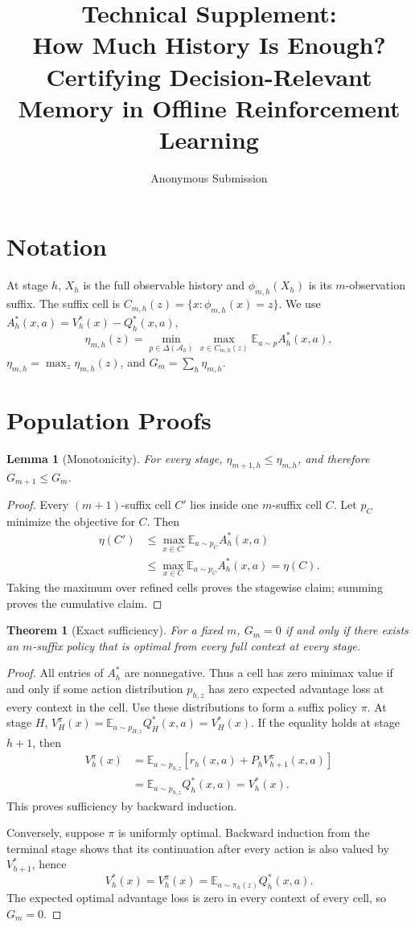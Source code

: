 \documentclass[letterpaper]{article} %
\title{Technical Supplement:\\
How Much History Is Enough? Certifying Decision-Relevant Memory in Offline Reinforcement Learning}
\author{Anonymous Submission}
\newtheorem{theorem}{Theorem}
\newtheorem{lemma}{Lemma}
\newcommand{\E}{\mathbb E}
\newcommand{\cA}{\mathcal A}
\begin{document}
\maketitle

\section{Notation}

At stage \(h\), \(X_h\) is the full observable history and
\(\phi_{m,h}(X_h)\) is its \(m\)-observation suffix.  The suffix cell is
\(C_{m,h}(z)=\{x:\phi_{m,h}(x)=z\}\).  We use
\(A_h^*(x,a)=V_h^*(x)-Q_h^*(x,a)\),
\[
\eta_{m,h}(z)=\min_{p\in\Delta(\cA_h)}
\max_{x\in C_{m,h}(z)}\E_{a\sim p}A_h^*(x,a),
\]
\(\eta_{m,h}=\max_z\eta_{m,h}(z)\), and
\(G_m=\sum_h\eta_{m,h}\).

\section{Population Proofs}

\begin{lemma}[Monotonicity]
For every stage, \(\eta_{m+1,h}\leq\eta_{m,h}\), and therefore
\(G_{m+1}\leq G_m\).
\end{lemma}
\begin{proof}
Every \((m+1)\)-suffix cell \(C'\) lies inside one \(m\)-suffix cell \(C\).
Let \(p_C\) minimize the objective for \(C\).  Then
\[
\begin{aligned}
\eta(C')
&\leq\max_{x\in C'}\E_{a\sim p_C}A_h^*(x,a)\\
&\leq\max_{x\in C}\E_{a\sim p_C}A_h^*(x,a)=\eta(C).
\end{aligned}
\]
Taking the maximum over refined cells proves the stagewise claim; summing
proves the cumulative claim.
\end{proof}

\begin{theorem}[Exact sufficiency]
For a fixed \(m\), \(G_m=0\) if and only if there exists an \(m\)-suffix
policy that is optimal from every full context at every stage.
\end{theorem}
\begin{proof}
All entries of \(A_h^*\) are nonnegative.  Thus a cell has zero minimax value
if and only if some action distribution \(p_{h,z}\) has zero expected
advantage loss at every context in the cell.  Use these distributions to form
a suffix policy \(\pi\).  At stage \(H\),
\(V_H^\pi(x)=\E_{a\sim p_{H,z}}Q_H^*(x,a)=V_H^*(x)\).  If the equality holds
at stage \(h+1\), then
\[
\begin{aligned}
V_h^\pi(x)
&=\E_{a\sim p_{h,z}}
  [r_h(x,a)+P_hV_{h+1}^\pi(x,a)]\\
&=\E_{a\sim p_{h,z}}Q_h^*(x,a)=V_h^*(x).
\end{aligned}
\]
This proves sufficiency by backward induction.

Conversely, suppose \(\pi\) is uniformly optimal.  Backward induction from the
terminal stage shows that its continuation after every action is also valued
by \(V_{h+1}^*\), hence
\[
V_h^*(x)=V_h^\pi(x)=\E_{a\sim\pi_h(z)}Q_h^*(x,a).
\]
The expected optimal advantage loss is zero in every context of every cell, so
\(G_m=0\).
\end{proof}
\end{document}
